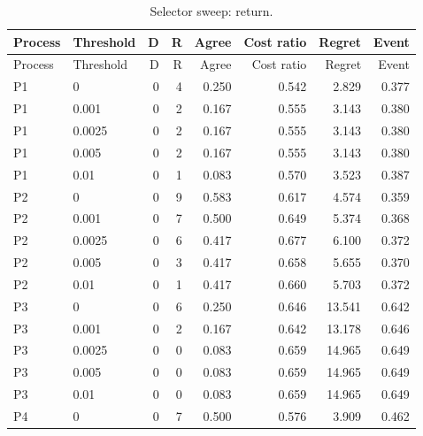 \begingroup\small\setlength{\tabcolsep}{3pt}\begin{longtable}{llrrrrrr}\caption{Selector sweep: return.}\\\toprule

Process & Threshold & D & R & Agree & Cost ratio & Regret & Event\\\midrule\endfirsthead

\toprule Process & Threshold & D & R & Agree & Cost ratio & Regret & Event\\\midrule\endhead

P1 & 0 & 0 & 4 & 0.250 & 0.542 & 2.829 & 0.377\\

P1 & 0.001 & 0 & 2 & 0.167 & 0.555 & 3.143 & 0.380\\

P1 & 0.0025 & 0 & 2 & 0.167 & 0.555 & 3.143 & 0.380\\

P1 & 0.005 & 0 & 2 & 0.167 & 0.555 & 3.143 & 0.380\\

P1 & 0.01 & 0 & 1 & 0.083 & 0.570 & 3.523 & 0.387\\

P2 & 0 & 0 & 9 & 0.583 & 0.617 & 4.574 & 0.359\\

P2 & 0.001 & 0 & 7 & 0.500 & 0.649 & 5.374 & 0.368\\

P2 & 0.0025 & 0 & 6 & 0.417 & 0.677 & 6.100 & 0.372\\

P2 & 0.005 & 0 & 3 & 0.417 & 0.658 & 5.655 & 0.370\\

P2 & 0.01 & 0 & 1 & 0.417 & 0.660 & 5.703 & 0.372\\

P3 & 0 & 0 & 6 & 0.250 & 0.646 & 13.541 & 0.642\\

P3 & 0.001 & 0 & 2 & 0.167 & 0.642 & 13.178 & 0.646\\

P3 & 0.0025 & 0 & 0 & 0.083 & 0.659 & 14.965 & 0.649\\

P3 & 0.005 & 0 & 0 & 0.083 & 0.659 & 14.965 & 0.649\\

P3 & 0.01 & 0 & 0 & 0.083 & 0.659 & 14.965 & 0.649\\

P4 & 0 & 0 & 7 & 0.500 & 0.576 & 3.909 & 0.462\\


\end{longtable}
